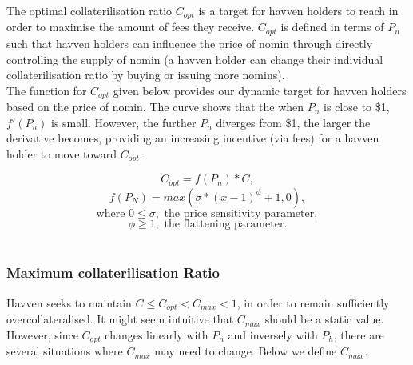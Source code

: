 \noindent The optimal collaterilisation ratio $C_{opt}$ is a target for havven holders to reach in order to maximise the amount of fees they receive. $C_{opt}$ is defined in terms of $P_n$ such that havven holders can influence the price of nomin through directly controlling the supply of nomin (a havven holder can change their individual collaterilisation ratio by buying or issuing more nomins). \\
 
\noindent The function for $C_{opt}$ given below provides our dynamic target for havven holders based on the price of nomin. The curve shows that the when $P_n$ is close to \$1, $ f'(P_n) $ is small. However, the further $P_n$ diverges from \$1, the larger the derivative becomes, providing an increasing incentive (via fees) for a havven holder to move toward $C_{opt}$.

$$ C_{opt} = f(P_n) * C,$$
$$ f(P_N) = max(\sigma * (x - 1)^{\phi} + 1, 0), $$
$$\text{where } 0 \leq \sigma, \text{ the price sensitivity parameter}, $$
$$\phi \geq 1, \text{ the flattening parameter}. $$ \\

\begin{center}
\end{center}

\newpage

\subsubsection{Maximum collaterilisation Ratio}

\noindent Havven seeks to maintain $C \leq C_{opt} < C_{max} < 1$, in order to remain sufficiently overcollateralised. It might seem intuitive that $C_{max}$ should be a static value. However, since $C_{opt}$ changes linearly with $P_n$ and inversely with $P_h$, there are several situations where $C_{max}$ may need to change. Below we define $C_{max}$. \\

